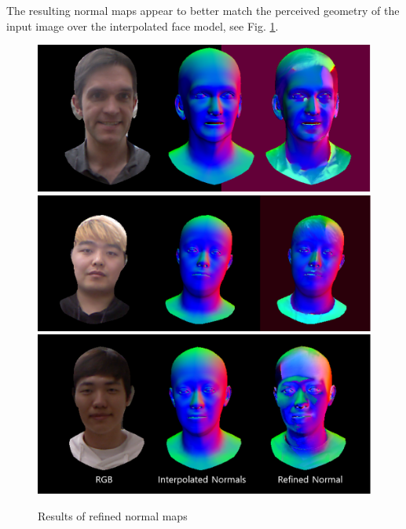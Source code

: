 \documentclass[10pt,twocolumn,letterpaper]{article}
\begin{document}
The resulting normal maps appear to better match the perceived geometry of the input image over the interpolated face model, see Fig. \ref{fig:normals}.
\begin{figure}[!h]
    \begin{center}
        \includegraphics [scale=0.33] {image/normals1.png}
        \includegraphics [scale=0.33] {image/normals2.png}
        \includegraphics [scale=0.33] {image/normals3.png}
    \end{center}
    \caption{Results of refined normal maps}
    \label{fig:normals}
\end{figure} 
\end{document}
